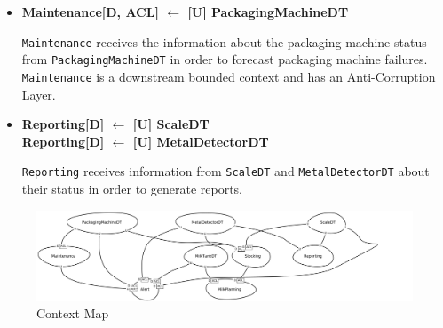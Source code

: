 \begin{itemize}
	\item \textbf{Maintenance[D, ACL] $\leftarrow$  [U] PackagingMachineDT}
	
    \texttt{Maintenance} receives the information about the packaging machine status from \texttt{PackagingMachineDT} in order to forecast packaging machine failures.
    \texttt{Maintenance} is a downstream bounded context and has an Anti-Corruption Layer.

	\item \textbf{Reporting[D] $\leftarrow$  [U] ScaleDT \\
    Reporting[D] $\leftarrow$  [U] MetalDetectorDT }

    \texttt{Reporting} receives information from \texttt{ScaleDT} and \texttt{MetalDetectorDT} about their status in order to generate reports.
	

\end{itemize}

\begin{figure}[H]
    \centering
    \includegraphics[width=\textwidth]{img/context-map.png}
    \caption{Context Map}
    \label{img:context-map}
\end{figure}


